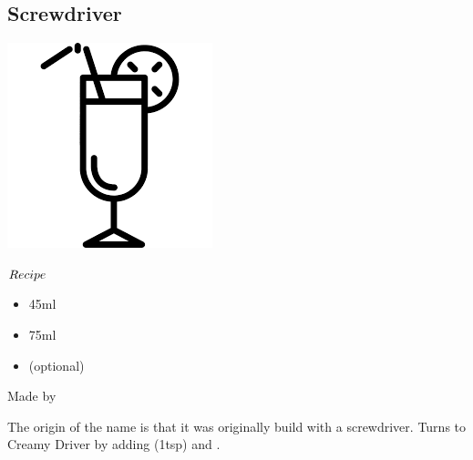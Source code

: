 \subsection{Screwdriver}
\vspace{-7.4mm}
\hspace{36mm}
\includegraphics[scale=.07]{cocktail_glass_tall.png}
\vspace{2.5mm}
\begin{itembox}[l]{\boldmath $Recipe$}
\begin{itemize}
\setlength{\parskip}{0cm}
\setlength{\itemsep}{0cm}
\item \vodka 45ml
\item \oj 75ml
\item \cherry (optional)
\end{itemize}
\vspace{-4mm}
Made by \build
\end{itembox}
The origin of the name is that it was originally build with a screwdriver.
Turns to Creamy Driver by adding \sugar (1tsp) and \ey
\hspace{-1mm}.
